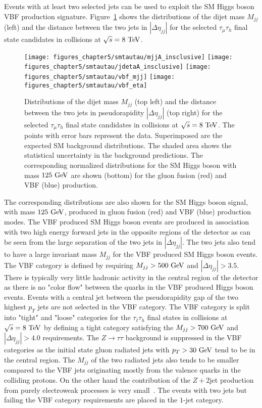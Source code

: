 Events with at least two selected jets can be used to exploit the SM Higgs boson VBF production signature. Figure~\ref{fig:vbfjet} shows the distributions of the dijet mass $M_{jj}$ (left) and the distance between the two jets in $|\Delta \eta_{jj}|$ for the selected $\tau_{\mu}\tau_{h}$ final state candidates in collisions at $\sqrt{s}=8~\mathrm{Te\kern -0.1em V}$. 
\begin{figure}[htbp]
\centering
\texttt{[image: figures\_chapter5/smtautau/mjjA\_insclusive]}
\texttt{[image: figures\_chapter5/smtautau/jdetaA\_insclusive]}
\texttt{[image: figures\_chapter5/smtautau/vbf\_mjj]}
\texttt{[image: figures\_chapter5/smtautau/vbf\_eta]}
\caption{Distributions of the dijet mass $M_{jj}$ (top left) and the distance between the two jets in pseudorapidity $|\Delta \eta_{jj}|$ (top right) for the selected $\tau_{\mu}\tau_{h}$ final state candidates in collisions at $\sqrt{s}=8~\mathrm{Te\kern -0.1em V}$. The points with error bars represent the data. Superimposed are the expected SM background distributions. The shaded area shows the statistical uncertainty in the background predictions. The corresponding normalized distributions for the SM Higgs boson with mass $125~\mathrm{Ge\kern -0.1em V}$ are shown (bottom) for the gluon fusion (red) and VBF (blue) production.}
\label{fig:vbfjet}
\end{figure}
The corresponding distributions are also shown for the SM Higgs boson signal, with mass $125~\mathrm{Ge\kern -0.1em V}$, produced in gluon fusion (red) and VBF (blue) production modes. The VBF produced SM Higgs boson events are produced in association with two high energy forward jets in the opposite regions of the detector as can be seen from the large separation of the two jets in $|\Delta \eta_{jj}|$. The two jets also tend to have a large invariant mass $M_{jj}$ for the VBF produced SM Higgs boson events.  The VBF category is defined by requiring $M_{jj}>500~\mathrm{Ge\kern -0.1em V}$ and  $|\Delta \eta_{jj}|>3.5$. There is typically very little hadronic activity in the central region of the detector as there is no "color flow" between the quarks in the VBF produced Higgs boson events. Events with a central jet between the pseudorapidity gap of the two highest $p_{T}$ jets are not selected in the VBF category. The VBF category is split into "tight" and "loose" categories for the $\tau_{\ell}\tau_{h}$ final states in collisions at $\sqrt{s}=8~\mathrm{Te\kern -0.1em V}$ by defining a tight category satisfying the $M_{jj}>700~\mathrm{Ge\kern -0.1em V}$ and $|\Delta \eta_{jj}|>4.0$ requirements. The $Z\rightarrow\tau\tau$ background is suppressed in the VBF categories as the initial state gluon radiated jets with $p_{T}>30~\mathrm{Ge\kern -0.1em V}$ tend to be in the central region. The $M_{jj}$ of the two radiated jets also tends to be smaller compared to the VBF jets originating mostly from the valence quarks in the colliding protons. On the other hand the contribution of the $Z+2$jet production from purely electroweak processes is very small~\cite{Khachatryan:2014dea}. The events with two jets but failing the VBF category requirements are placed in the $1$-jet category. 

